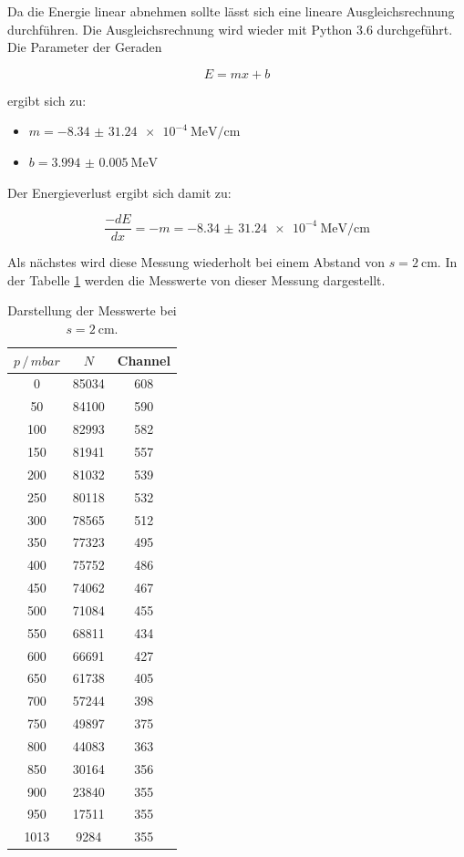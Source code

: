 Da die Energie linear abnehmen sollte lässt sich eine lineare Ausgleichsrechnung
durchführen. Die Ausgleichsrechnung wird wieder mit Python 3.6 durchgeführt.
Die Parameter der Geraden

\begin{equation*}
  E = mx + b
\end{equation*}

ergibt sich zu:

\begin{itemize}
  \item $m = \SI{-8.34(3124)e-4}{\mega\eV\per\centi\meter}$
  \item $b = \SI{3.994(5)}{\mega\eV}$
\end{itemize}

Der Energieverlust ergibt sich damit zu:

\begin{equation*}
  \frac{-dE}{dx} = -m = \SI{-8.34(3124)e-4}{\mega\eV\per\centi\meter}
\end{equation*}

Als nächstes wird diese Messung wiederholt bei einem Abstand von $s = \SI{2}{\centi\meter}$.
In der Tabelle \ref{tab:2} werden die Messwerte von dieser Messung dargestellt.

\begin{table}[H]
  \centering
  \caption{Darstellung der Messwerte bei $s = \SI{2}{\centi\meter}$.}
  \label{tab:2}
  \begin{tabular}{c c c}
    \toprule
    $p \, / \, mbar$ & $N$ & Channel \\
    \midrule
    0  & 85034& 608 \\
    50 & 84100& 590 \\
    100& 82993& 582 \\
    150& 81941& 557 \\
    200& 81032& 539 \\
    250& 80118& 532 \\
    300& 78565& 512 \\
    350& 77323& 495 \\
    400& 75752& 486 \\
    450& 74062& 467 \\
    500& 71084& 455 \\
    550& 68811& 434 \\
    600& 66691& 427 \\
    650& 61738& 405 \\
    700& 57244& 398 \\
    750& 49897& 375 \\
    800& 44083& 363 \\
    850& 30164& 356 \\
    900& 23840& 355 \\
    950& 17511& 355 \\
   1013 &  9284& 355 \\
    \bottomrule
  \end{tabular}
\end{table}

